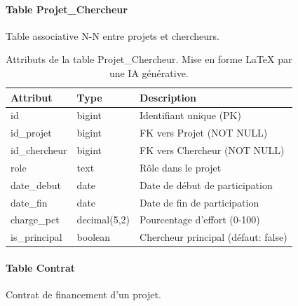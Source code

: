 \documentclass[12pt,a4paper]{article}
\begin{document}
\paragraph{Table Projet\_Chercheur}
Table associative N-N entre projets et chercheurs.

\begin{table}[H]
\centering
\small
\begin{tabular}{@{}llp{5.5cm}@{}}
\toprule
\textbf{Attribut} & \textbf{Type} & \textbf{Description} \\ \midrule
id & bigint & Identifiant unique (PK) \\
id\_projet & bigint & FK vers Projet (NOT NULL) \\
id\_chercheur & bigint & FK vers Chercheur (NOT NULL) \\
role & text & Rôle dans le projet \\
date\_debut & date & Date de début de participation \\
date\_fin & date & Date de fin de participation \\
charge\_pct & decimal(5,2) & Pourcentage d'effort (0-100) \\
is\_principal & boolean & Chercheur principal (défaut: false) \\ \bottomrule
\end{tabular}
\caption{Attributs de la table Projet\_Chercheur. Mise en forme LaTeX par une IA générative.}
\end{table}

\paragraph{Table Contrat}
Contrat de financement d'un projet.
\end{document}
